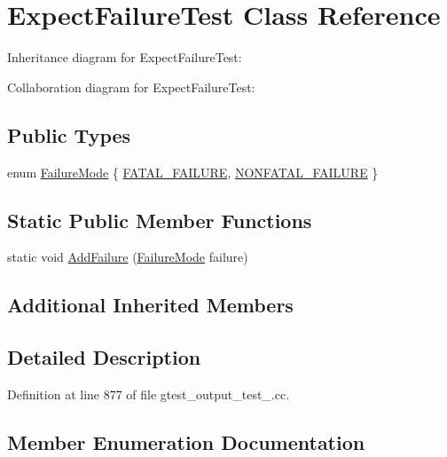 \hypertarget{class_expect_failure_test}{}\section{Expect\+Failure\+Test Class Reference}
\label{class_expect_failure_test}


Inheritance diagram for Expect\+Failure\+Test\+:


Collaboration diagram for Expect\+Failure\+Test\+:
\subsection*{Public Types}
\begin{DoxyCompactItemize}
\item 
enum \hyperlink{class_expect_failure_test_aad05da10bb15d21a434eba3b37011406}{Failure\+Mode} \{ \hyperlink{class_expect_failure_test_aad05da10bb15d21a434eba3b37011406a3d618496b7e2a2c256e02186bddee4ec}{F\+A\+T\+A\+L\+\_\+\+F\+A\+I\+L\+U\+RE}, 
\hyperlink{class_expect_failure_test_aad05da10bb15d21a434eba3b37011406aeabdbecc0c4550d4f46cd44ac62fb92b}{N\+O\+N\+F\+A\+T\+A\+L\+\_\+\+F\+A\+I\+L\+U\+RE}
 \}
\end{DoxyCompactItemize}
\subsection*{Static Public Member Functions}
\begin{DoxyCompactItemize}
\item 
static void \hyperlink{class_expect_failure_test_ab9aeb7820ff7953fc2975ecc5abd046b}{Add\+Failure} (\hyperlink{class_expect_failure_test_aad05da10bb15d21a434eba3b37011406}{Failure\+Mode} failure)
\end{DoxyCompactItemize}
\subsection*{Additional Inherited Members}


\subsection{Detailed Description}


Definition at line 877 of file gtest\+\_\+output\+\_\+test\+\_\+.\+cc.



\subsection{Member Enumeration Documentation}
